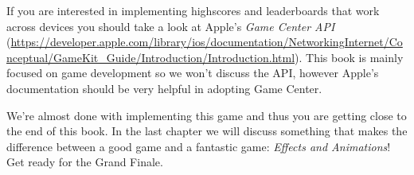 \begin{details}[frametitle={Advanced Highscores}]
If you are interested in implementing highscores and leaderboards that work
across devices you should take a look at Apple's \textit{Game Center API}
(\url{https://developer.apple.com/library/ios/documentation/NetworkingInternet/Conceptual/GameKit_Guide/Introduction/Introduction.html}).
This book is mainly focused on game development so we won't discuss
the API, however Apple's documentation should be very helpful in
adopting Game Center.
\end{details}

We're almost done with implementing this game and thus you are getting close to
the end of this book. In the last chapter we will discuss something that makes
the difference between a good game and a fantastic game: \textit{Effects and
Animations}! Get ready for the Grand Finale.

